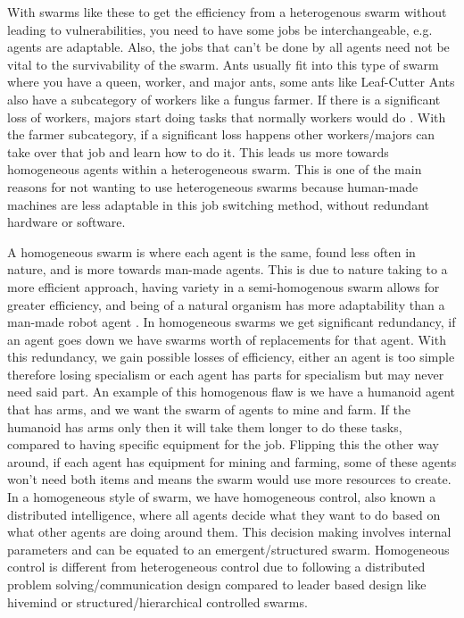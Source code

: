 \documentclass{UoYCSproject}
\begin{document}
With swarms like these to get the efficiency from a heterogenous swarm without leading to vulnerabilities, you need to have some jobs be interchangeable, e.g. agents are adaptable. Also, the jobs that can't be done by all agents need not be vital to the survivability of the swarm.
Ants usually fit into this type of swarm where you have a queen, worker, and major ants, some ants like Leaf-Cutter Ants also have a subcategory of workers like a fungus farmer.
If there is a significant loss of workers, majors start doing tasks that normally workers would do \cite{Swarm intellegiegence}. With the farmer subcategory, if a significant loss happens other workers/majors can take over that job and learn how to do it. This leads us more towards homogeneous agents within a heterogeneous swarm.
This is one of the main reasons for not wanting to use heterogeneous swarms because human-made machines are less adaptable in this job switching method, without redundant hardware or software.

A homogeneous swarm is where each agent is the same, found less often in nature, and is more towards man-made agents. This is due to nature taking to a more efficient approach, having variety in a semi-homogenous swarm allows for greater efficiency, and being of a natural organism has more adaptability than a man-made robot agent \cite{Swarm robotics reviewed, Swarm intellegiegence}.
In homogeneous swarms we get significant redundancy, if an agent goes down we have swarms worth of replacements for that agent.
With this redundancy, we gain possible losses of efficiency, either an agent is too simple therefore losing specialism or each agent has parts for specialism but may never need said part.
An example of this homogenous flaw is we have a humanoid agent that has arms, and we want the swarm of agents to mine and farm. If the humanoid has arms only then it will take them longer to do these tasks, compared to having specific equipment for the job.
Flipping this the other way around, if each agent has equipment for mining and farming, some of these agents won't need both items and means the swarm would use more resources to create.
In a homogeneous style of swarm, we have homogeneous control, also known a distributed intelligence, where all agents decide what they want to do based on what other agents are doing around them. This decision making involves internal parameters and can be equated to an emergent/structured swarm.
Homogeneous control is different from heterogeneous control due to following a distributed problem solving/communication design compared to leader based design like hivemind or structured/hierarchical controlled swarms.
\end{document}
